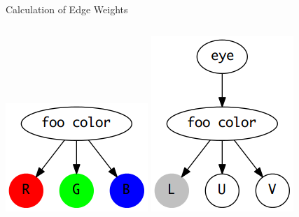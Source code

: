 \documentclass[14pt]{beamer}
\begin{document}
\begin{frame}{Calculation of Edge Weights}
    \begin{columns}
        \includegraphics[scale=0.45]{rgb.png} \pause
        \includegraphics[scale=0.45]{luv.png}
    \end{columns}
\end{frame}
\end{document}
